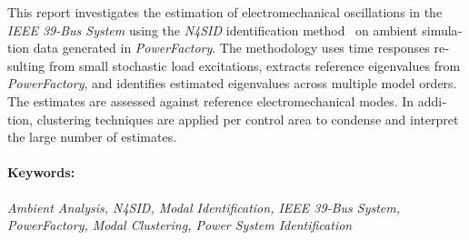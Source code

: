 \begin{english}
This report investigates the estimation of electromechanical oscillations in the \textit{IEEE 39-Bus System} using the \textit{N4SID} identification method~\cite{n4sid1994} on ambient simulation data generated in \textit{PowerFactory}. The methodology uses time responses resulting from small stochastic load excitations, extracts reference eigenvalues from \textit{PowerFactory}, and identifies estimated eigenvalues across multiple model orders. The estimates are assessed against reference electromechanical modes. In addition, clustering techniques are applied per control area to condense and interpret the large number of estimates.

\paragraph{Keywords:} \textit{Ambient Analysis, N4SID, Modal Identification, IEEE 39-Bus System, PowerFactory, Modal Clustering, Power System Identification}
\end{english}
